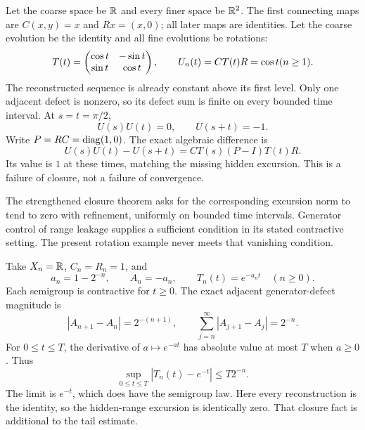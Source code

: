 Let the coarse space be $\RR$ and every finer space be $\RR^2$. The first connecting maps are $C(x,y)=x$ and $Rx=(x,0)$; all later maps are identities. Let the coarse evolution be the identity and all fine evolutions be rotations:
\[
T(t)=\begin{pmatrix}\cos t&-\sin t\\\sin t&\cos t\end{pmatrix},\qquad
U_n(t)=CT(t)R=\cos t(n\ge1).
\]
The reconstructed sequence is already constant above its first level. Only one adjacent defect is nonzero, so its defect sum is finite on every bounded time interval.
At $s=t=\pi/2$,
\[
U(s)U(t)=0,\qquad U(s+t)=-1.
\]
Write $P=RC=\operatorname{diag}(1,0)$. The exact algebraic difference is
\[
U(s)U(t)-U(s+t)=CT(s)(P-I)T(t)R.
\]
Its value is $1$ at these times, matching the missing hidden excursion. This is a failure of closure, not a failure of convergence.

The strengthened closure theorem asks for the corresponding excursion norm to tend to zero with refinement, uniformly on bounded time intervals. Generator control of range leakage supplies a sufficient condition in its stated contractive setting. The present rotation example never meets that vanishing condition.

Take $X_n=\RR$, $C_n=R_n=1$, and
\[
a_n=1-2^{-n},\qquad A_n=-a_n,\qquad T_n(t)=e^{-a_nt}\quad(n\ge0).
\]
Each semigroup is contractive for $t\ge0$. The exact adjacent generator-defect magnitude is
\[
|A_{n+1}-A_n|=2^{-(n+1)},\qquad
\sum_{j=n}^{\infty}|A_{j+1}-A_j|=2^{-n}.
\]
For $0\le t\le T$, the derivative of $a\mapsto e^{-at}$ has absolute value at most $T$ when $a\ge0$. Thus
\[
\sup_{0\le t\le T}|T_n(t)-e^{-t}|\le T2^{-n}.
\]
The limit is $e^{-t}$, which does have the semigroup law. Here every reconstruction is the identity, so the hidden-range excursion is identically zero. That closure fact is additional to the tail estimate.

